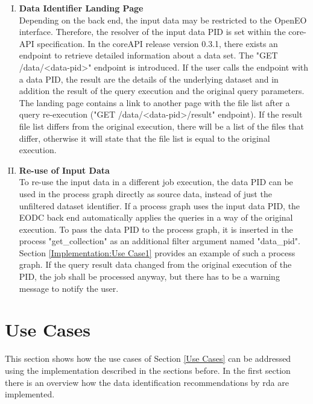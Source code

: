 \documentclass[draft,final]{vutinfth} %
\begin{document}
\begin{enumerate}[I.]
\item \textbf{Data Identifier Landing Page} \\
	Depending on the back end, the input data may be restricted to the OpenEO interface. Therefore, the resolver of the input data PID is set within the core-API specification. In the coreAPI release version 0.3.1, there exists an endpoint to retrieve detailed information about a data set. The "GET /data/<data-pid>" endpoint is introduced. If the user calls the endpoint with a data PID, the result are the details of the underlying dataset and in addition the result of the query execution and the original query parameters. The landing page contains a link to another page with the file list after a query re-execution ("GET /data/<data-pid>/result" endpoint). If the result file list differs from the original execution, there will be a list of the files that differ, otherwise it will state that the file list is equal to the original execution. 

\item \textbf{Re-use of Input Data} \\
	To re-use the input data in a different job execution, the data PID can be used in the process graph directly as source data, instead of just the unfiltered dataset identifier. If a process graph uses the input data PID, the EODC back end automatically applies the queries in a way of the original execution. To pass the data PID to the process graph, it is inserted in the process "get\_collection" as an additional filter argument named "data\_pid". Section \ref{Implementation:Use Case1} provides an example of such a process graph. If the query result data changed from the original execution of the PID, the job shall be processed anyway, but there has to be a warning message to notify the user.  
\end{enumerate}
\section{Use Cases}
This section shows how the use cases of Section \ref{Use Cases} can be addressed using the implementation described in the sections before. In the first section there is an overview how the data identification recommendations by \acrshort{rda} are implemented. 
\end{document}
